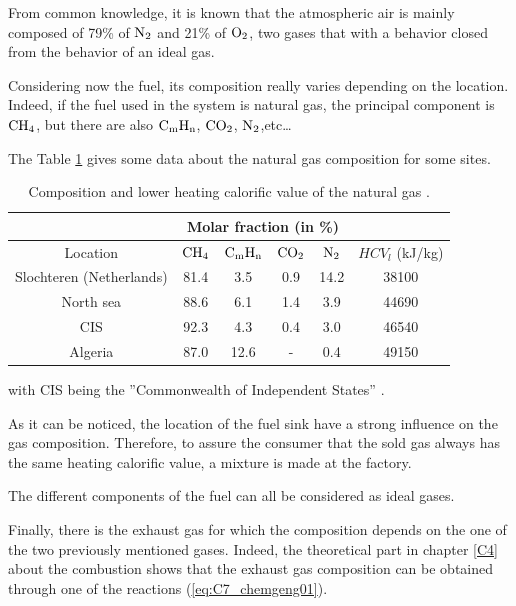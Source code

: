 From common knowledge, it is known that the atmospheric air is mainly composed of 79\% of $\ce{N2}$ and 21\% of $\ce{O2}$, two gases that with a behavior closed from the behavior of an ideal gas.

Considering now the fuel, its composition really varies depending on the location. Indeed, if the fuel used in the system is natural gas, the principal component is $\ce{CH4}$, but there are also $\ce{C}_\text{m}\ce{H}_\text{n}$, $\ce{CO2}$, $\ce{N2}$,etc\dots

The Table \ref{tab:C7_compgas} gives some data about the natural gas composition for some sites.

\begin{longtable}[c]{cccccc}
\caption{Composition and lower heating calorific value of the natural gas \cite{Leonard2018}.}
\label{tab:C7_compgas}\\
\hline
\textbf{\textbf{}}       & \multicolumn{4}{c}{\textbf{Molar fraction (in \%)}}                    &                 \\ \hline
\endfirsthead
%
\endhead
%
\hline
\endfoot
%
\endlastfoot
%
Location                 & $\ce{CH4}$ & $\ce{C}_\text{m}\ce{H}_\text{n}$ & $\ce{CO2}$ & $\ce{N2}$ & $HCV_l$ (kJ/kg) \\
Slochteren (Netherlands) & 81.4       & 3.5                              & 0.9        & 14.2      & 38100           \\
North sea                & 88.6       & 6.1                              & 1.4        & 3.9       & 44690           \\
CIS                      & 92.3       & 4.3                              & 0.4        & 3.0       & 46540           \\
Algeria                  & 87.0       & 12.6                             & -          & 0.4       & 49150           \\ \hline
\end{longtable}
with CIS being the ''Commonwealth of Independent States'' \cite{EncyclopaediaBritannica2018}.

As it can be noticed, the location of the fuel sink have a strong influence on the gas composition. Therefore, to assure the consumer that the sold gas always has the same heating calorific value, a mixture is made at the factory. 

The different components of the fuel can all be considered as ideal gases. 

Finally, there is the exhaust gas for which the composition depends on the one of the two previously mentioned gases. Indeed, the theoretical part in chapter \ref{C4} about the combustion shows that the exhaust gas composition can be obtained through one of the reactions (\ref{eq:C7_chemgeng01}).

